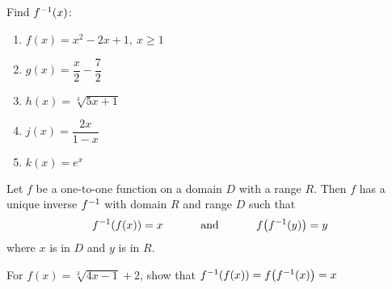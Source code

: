 \documentclass[../mathNotesPreamble]{subfiles}
\begin{document}
  \begin{ex*}
    Find $f^{-1}(x)$:
    \begin{enumerate}[label=, itemsep=50pt]
      \item $f(x)=x^2-2x+1,\ x\geq 1$
      \item $g(x)=\dfrac{x}{2}-\dfrac{7}{2}$
      \item $h(x)=\sqrt[3]{5x+1}$
      \item $j(x)=\dfrac{2x}{1-x}$
      \item $k(x)=e^x$
    \end{enumerate}
  \end{ex*}
  \pagebreak

  \begin{thmBox*}
    Let $f$ be a one-to-one function on a domain $D$ with a range $R$. Then $f$ has a unique inverse $f^{-1}$ with domain $R$ and range $D$ such that
    \[f^{-1}{\left(f(x)\right)}=x\hspace*{30pt}\text{ and }\hspace*{30pt}f{\left(f^{-1}(y)\right)}=y\]
  where $x$ is in $D$ and $y$ is in $R$.
  \end{thmBox*}
  \vspace*{15pt}

  \begin{ex*}
    For $f(x)=\sqrt[3]{4x-1}+2$, show that $f^{-1}{\left(f(x)\right)}=f{\left(f^{-1}(x)\right)}=x$
  \end{ex*}
  \pagebreak
\end{document}
